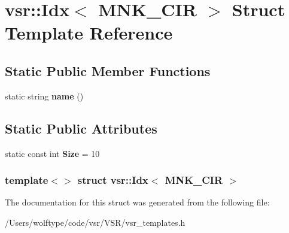\hypertarget{structvsr_1_1_idx_3_01_m_n_k___c_i_r_01_4}{\section{vsr\-:\-:Idx$<$ M\-N\-K\-\_\-\-C\-I\-R $>$ Struct Template Reference}
\label{structvsr_1_1_idx_3_01_m_n_k___c_i_r_01_4}
}
\subsection*{Static Public Member Functions}
\begin{DoxyCompactItemize}
\item 
\hypertarget{structvsr_1_1_idx_3_01_m_n_k___c_i_r_01_4_aac1d5636a03fd2e666c52112d96479de}{static string {\bfseries name} ()}\label{structvsr_1_1_idx_3_01_m_n_k___c_i_r_01_4_aac1d5636a03fd2e666c52112d96479de}

\end{DoxyCompactItemize}
\subsection*{Static Public Attributes}
\begin{DoxyCompactItemize}
\item 
\hypertarget{structvsr_1_1_idx_3_01_m_n_k___c_i_r_01_4_a25c44bee692f58ce26c5db40af9a5c8b}{static const int {\bfseries Size} = 10}\label{structvsr_1_1_idx_3_01_m_n_k___c_i_r_01_4_a25c44bee692f58ce26c5db40af9a5c8b}

\end{DoxyCompactItemize}
\subsubsection*{template$<$$>$ struct vsr\-::\-Idx$<$ M\-N\-K\-\_\-\-C\-I\-R $>$}



The documentation for this struct was generated from the following file\-:\begin{DoxyCompactItemize}
\item 
/\-Users/wolftype/code/vsr/\-V\-S\-R/vsr\-\_\-templates.\-h\end{DoxyCompactItemize}
